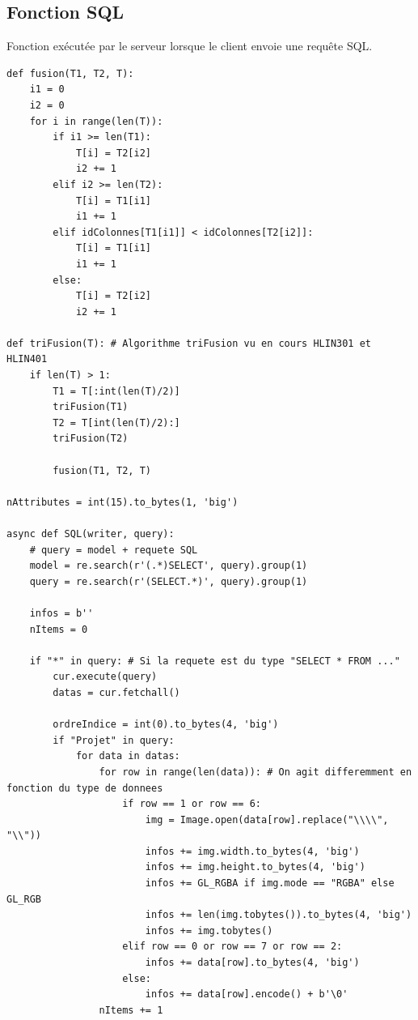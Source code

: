 \documentclass{report}
\begin{document}
\begin{appendix}
\section{Fonction SQL}
Fonction exécutée par le serveur lorsque le client envoie une requête SQL.

\begin{lstlisting}[style=py, caption=serveur.py : SQL, label=sql]
def fusion(T1, T2, T):
    i1 = 0
    i2 = 0
    for i in range(len(T)):
        if i1 >= len(T1):
            T[i] = T2[i2]
            i2 += 1
        elif i2 >= len(T2):
            T[i] = T1[i1]
            i1 += 1
        elif idColonnes[T1[i1]] < idColonnes[T2[i2]]:
            T[i] = T1[i1]
            i1 += 1
        else:
            T[i] = T2[i2]
            i2 += 1

def triFusion(T): # Algorithme triFusion vu en cours HLIN301 et HLIN401
    if len(T) > 1:
        T1 = T[:int(len(T)/2)]
        triFusion(T1)
        T2 = T[int(len(T)/2):]
        triFusion(T2)
        
        fusion(T1, T2, T)

nAttributes = int(15).to_bytes(1, 'big')

async def SQL(writer, query):
    # query = model + requete SQL
    model = re.search(r'(.*)SELECT', query).group(1)
    query = re.search(r'(SELECT.*)', query).group(1)

    infos = b''
    nItems = 0

    if "*" in query: # Si la requete est du type "SELECT * FROM ..."
        cur.execute(query)
        datas = cur.fetchall()

        ordreIndice = int(0).to_bytes(4, 'big')
        if "Projet" in query:
            for data in datas:
                for row in range(len(data)): # On agit differemment en fonction du type de donnees
                    if row == 1 or row == 6:
                        img = Image.open(data[row].replace("\\\\", "\\"))
                        infos += img.width.to_bytes(4, 'big')
                        infos += img.height.to_bytes(4, 'big')
                        infos += GL_RGBA if img.mode == "RGBA" else GL_RGB
                        infos += len(img.tobytes()).to_bytes(4, 'big')
                        infos += img.tobytes()
                    elif row == 0 or row == 7 or row == 2:
                        infos += data[row].to_bytes(4, 'big')
                    else:
                        infos += data[row].encode() + b'\0'
                nItems += 1


\end{lstlisting}
\end{appendix}
\end{document}
